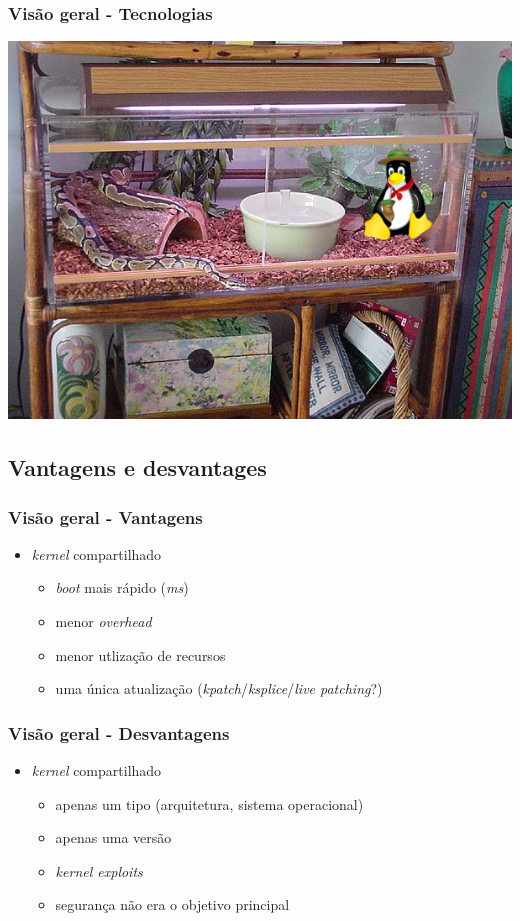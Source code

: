 \documentclass{beamer}
\begin{document}
\begin{frame}
    \frametitle{Visão geral - Tecnologias}
    \centering
    \includegraphics[width=0.8\linewidth]{img/BetsyAcyrilcSnakeCage02_tche_tux.png}
\end{frame}

\subsection{Vantagens e desvantages}

\begin{frame}
    \frametitle{Visão geral - Vantagens}
    \begin{itemize}
        \item \textit{kernel} compartilhado
            \begin{itemize}
                \item \textit{boot} mais rápido (\textit{ms})
                \item menor \textit{overhead}
                \item menor utlização de recursos
                \item uma única atualização
                    (\textit{kpatch}/\textit{ksplice}/\textit{live patching}?)
            \end{itemize}
    \end{itemize}
\end{frame}

\begin{frame}
    \frametitle{Visão geral - Desvantagens}
    \begin{itemize}
        \item \textit{kernel} compartilhado
        \begin{itemize}
            \item apenas um tipo (arquitetura, sistema operacional)
            \item apenas uma versão
            \item \textit{kernel exploits}
            \item segurança não era o objetivo principal
        \end{itemize}
    \end{itemize}
\end{frame}
\end{document}
